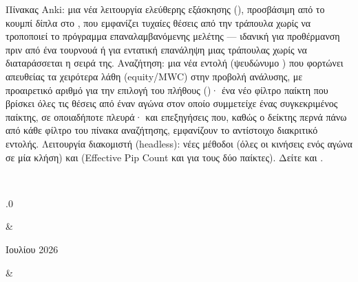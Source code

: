 \documentclass[letterpaper,10pt,greek]{sphinxmanual}
\begin{document}
\begin{savenotes}
\begin{longtable}{}
\begin{varwidth}[t]{}
Πίνακας Anki: μια νέα λειτουργία ελεύθερης εξάσκησης (), προσβάσιμη από το κουμπί  δίπλα στο , που εμφανίζει τυχαίες θέσεις από την τράπουλα χωρίς να τροποποιεί το πρόγραμμα επαναλαμβανόμενης μελέτης — ιδανική για προθέρμανση πριν από ένα τουρνουά ή για εντατική επανάληψη μιας τράπουλας χωρίς να διαταράσσεται η σειρά της. Αναζήτηση: μια νέα εντολή  (ψευδώνυμο ) που φορτώνει απευθείας τα χειρότερα λάθη (equity/MWC) στην προβολή ανάλυσης, με προαιρετικό αριθμό για την επιλογή του πλήθους ()· ένα νέο φίλτρο παίκτη  που βρίσκει όλες τις θέσεις από έναν αγώνα στον οποίο συμμετείχε ένας συγκεκριμένος παίκτης, σε οποιαδήποτε πλευρά· και επεξηγήσεις που, καθώς ο δείκτης περνά πάνω από κάθε φίλτρο του πίνακα αναζήτησης, εμφανίζουν το αντίστοιχο διακριτικό εντολής. Λειτουργία διακομιστή (headless): νέες μέθοδοι  (όλες οι κινήσεις ενός αγώνα σε μία κλήση) και  (Effective Pip Count και για τους δύο παίκτες). Δείτε {\hyperref[\detokenize{manuel:panneau-anki}]{}} και {\hyperref[\detokenize{cmd_mode:cmd-mode}]{}}.
\sphinxbeforeendvarwidth
\end{varwidth}%
\\
\sphinxhline\begin{varwidth}[t]{}
.0
\sphinxbeforeendvarwidth
\end{varwidth}%
&\begin{varwidth}[t]{}
 Ιουλίου 2026
\sphinxbeforeendvarwidth
\end{varwidth}%
&\begin{varwidth}[t]{}
\sphinxAtStartPar

\end{varwidth}
\end{longtable}
\end{savenotes}
\end{document}
